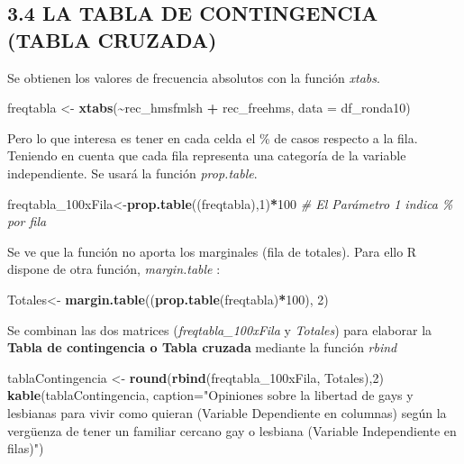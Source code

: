 \documentclass[
  12 pt,
  a4paper,
]{article}
\newenvironment{Shaded}{\begin{snugshade}}{\end{snugshade}}
\newcommand{\AttributeTok}[1]{\textcolor[rgb]{0.13,0.29,0.53}{#1}}
\newcommand{\CommentTok}[1]{\textcolor[rgb]{0.56,0.35,0.01}{\textit{#1}}}
\newcommand{\DecValTok}[1]{\textcolor[rgb]{0.00,0.00,0.81}{#1}}
\newcommand{\FunctionTok}[1]{\textcolor[rgb]{0.13,0.29,0.53}{\textbf{#1}}}
\newcommand{\NormalTok}[1]{#1}
\newcommand{\OtherTok}[1]{\textcolor[rgb]{0.56,0.35,0.01}{#1}}
\newcommand{\SpecialCharTok}[1]{\textcolor[rgb]{0.81,0.36,0.00}{\textbf{#1}}}
\newcommand{\StringTok}[1]{\textcolor[rgb]{0.31,0.60,0.02}{#1}}
\begin{document}
\subsection{3.4 LA TABLA DE CONTINGENCIA (TABLA
CRUZADA)}\label{la-tabla-de-contingencia-tabla-cruzada}

Se obtienen los valores de frecuencia absolutos con la función
\emph{xtabs}.

\begin{Shaded}
\begin{Highlighting}[]
\NormalTok{freqtabla }\OtherTok{\textless{}{-}} \FunctionTok{xtabs}\NormalTok{(}\SpecialCharTok{\textasciitilde{}}\NormalTok{rec\_hmsfmlsh }\SpecialCharTok{+}\NormalTok{ rec\_freehms, }\AttributeTok{data =}\NormalTok{ df\_ronda10)}
\end{Highlighting}
\end{Shaded}

Pero lo que interesa es tener en cada celda el \% de casos respecto a la
fila. Teniendo en cuenta que cada fila representa una categoría de la
variable independiente. Se usará la función \emph{prop.table}.

\begin{Shaded}
\begin{Highlighting}[]
\NormalTok{freqtabla\_100xFila}\OtherTok{\textless{}{-}}\FunctionTok{prop.table}\NormalTok{((freqtabla),}\DecValTok{1}\NormalTok{)}\SpecialCharTok{*}\DecValTok{100} \CommentTok{\# El Parámetro 1 indica \% por fila}
\end{Highlighting}
\end{Shaded}

Se ve que la función no aporta los marginales (fila de totales). Para
ello R dispone de otra función, \emph{margin.table} :

\begin{Shaded}
\begin{Highlighting}[]
\NormalTok{Totales}\OtherTok{\textless{}{-}} \FunctionTok{margin.table}\NormalTok{((}\FunctionTok{prop.table}\NormalTok{(freqtabla)}\SpecialCharTok{*}\DecValTok{100}\NormalTok{), }\DecValTok{2}\NormalTok{)}
\end{Highlighting}
\end{Shaded}

Se combinan las dos matrices (\emph{freqtabla\_100xFila} y
\emph{Totales}) para elaborar la \textbf{Tabla de contingencia o Tabla
cruzada} mediante la función \emph{rbind}

\begin{Shaded}
\begin{Highlighting}[]
\NormalTok{tablaContingencia }\OtherTok{\textless{}{-}} \FunctionTok{round}\NormalTok{(}\FunctionTok{rbind}\NormalTok{(freqtabla\_100xFila, Totales),}\DecValTok{2}\NormalTok{)}
\FunctionTok{kable}\NormalTok{(tablaContingencia, }\AttributeTok{caption=}\StringTok{"Opiniones sobre la libertad de gays y lesbianas para vivir como quieran (Variable Dependiente en columnas) según la vergüenza de tener un familiar cercano gay o lesbiana (Variable Independiente en filas)"}\NormalTok{)}
\end{Highlighting}
\end{Shaded}
\end{document}

